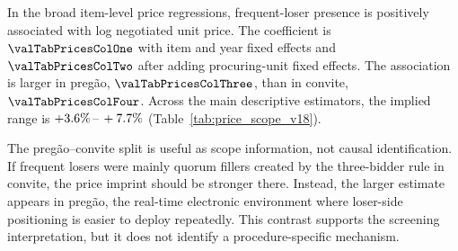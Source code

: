 In the broad item-level price regressions, frequent-loser
presence is positively associated with log negotiated unit
price. The coefficient is $\valTabPricesColOne$ with item and
year fixed effects and $\valTabPricesColTwo$ after adding
procuring-unit fixed effects. The association is larger in
pregão, $\valTabPricesColThree$, than in convite,
$\valTabPricesColFour$. Across the main descriptive estimators,
the implied range is $+3.6\%\,\text{--}\,+7.7\%$
(Table~\ref{tab:price_scope_v18}).

The pregão--convite split is useful as scope information, not
causal identification. If frequent losers were mainly quorum
fillers created by the three-bidder rule in convite, the price
imprint should be stronger there. Instead, the larger estimate
appears in pregão, the real-time electronic environment where
loser-side positioning is easier to deploy repeatedly. This
contrast supports the screening interpretation, but it does not
identify a procedure-specific mechanism.

